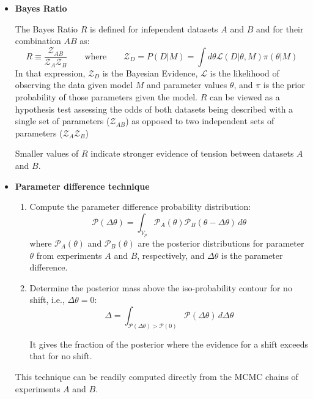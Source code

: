 \begin{itemize}
    \item \textbf{Bayes Ratio}
    
    The Bayes Ratio $R$ is defined for infependent datasets $A$ and $B$  and for their combination $AB$ as:
    $$
    R \equiv \dfrac{\mathcal{Z}_{AB}}{\mathcal{Z}_{A}\mathcal{Z}_{B}}
    \qquad
    \text{where}
    \qquad
    \mathcal{Z}_{D} = P(D|M) = \int d\theta \mathcal{L}(D|\theta, M)\pi(\theta|M)
    $$
    In that expression, $\mathcal{Z}_{D}$ is the Bayesian Evidence, $\mathcal{L}$ is the likelihood of observing the data given model $M$ and parameter values $\theta$, and $\pi$ is the prior probability of those parameters given the model. $R$ can be viewed as a hypothesis test assessing the odds of both datasets being described with a single set of parameters ($\mathcal{Z}_{AB}$) as opposed to two independent sets of parameters ($\mathcal{Z}_{A}\mathcal{Z}_{B}$)

    Smaller values of $R$ indicate stronger evidence of tension between datasets $A$ and $B$.

    \item \textbf{Parameter difference technique}
    
    \begin{enumerate}
        \item Compute the parameter difference probability distribution:
        $$
            \mathcal{P}(\Delta\theta) = \int_{V_p} \mathcal{P}_A(\theta) \mathcal{P}_B(\theta - \Delta\theta)\, d\theta
        $$
        where $\mathcal{P}_A(\theta)$ and $\mathcal{P}_B(\theta)$ are the posterior distributions for parameter $\theta$ from experiments $A$ and $B$, respectively, and $\Delta\theta$ is the parameter difference.

        \item Determine the posterior mass above the iso-probability contour for no shift, i.e., $\Delta\theta = 0$:
        $$
            \Delta = \int_{\mathcal{P}(\Delta\theta) > \mathcal{P}(0)} \mathcal{P}(\Delta\theta)\, d\Delta\theta
        $$
   
        It gives the fraction of the posterior where the evidence for a shift exceeds that for no shift.
    \end{enumerate}
    
    This technique can be readily computed directly from the MCMC chains of experiments $A$ and $B$.

\end{itemize}

